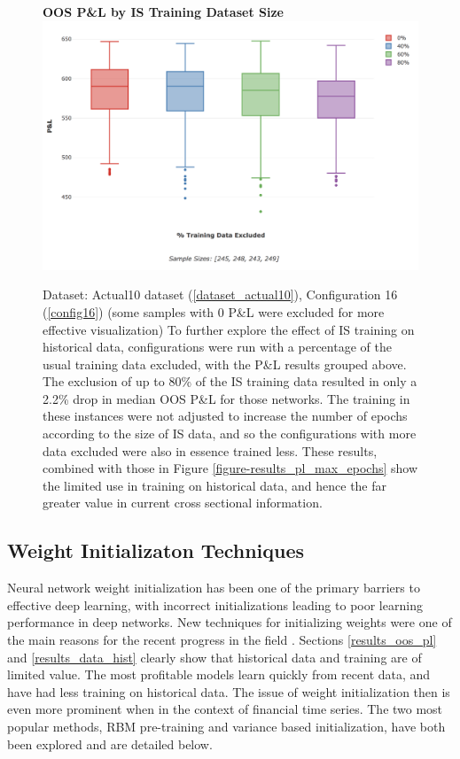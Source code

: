 \documentclass[a4paper,11pt,oneside]{article}
\theoremstyle{plain}
\theoremstyle{definition}
\begin{document}
	
	\begin{figure}[H]
		\centering 
		\textbf{OOS P\&L by IS Training Dataset Size}
		\includegraphics[scale=0.4]{images/results/data/training_data_excluded.png}
		\caption[OOS P\&L by IS Training Dataset Size]{
			Dataset: Actual10 dataset (\ref{dataset_actual10}), Configuration 16 (\ref{config16}) (some samples with 0 P\&L were excluded for more effective visualization)
			\newline To further explore the effect of IS training on historical data, configurations were run with a percentage of the usual training data excluded, with the P\&L results grouped above. The exclusion of up to 80\% of the IS training data resulted in only a 2.2\% drop in median OOS P\&L for those networks. The training in these instances were not adjusted to increase the number of epochs according to the size of IS data, and so the configurations with more data excluded were also in essence trained less. These results, combined with those in Figure \ref{figure-results_pl_max_epochs} show the limited use in training on historical data, and hence the far greater value in current cross sectional information.}
		\label{figure-results_it3_validationset}
	\end{figure}
	
	
	\newpage
	
	\subsection{Weight Initializaton Techniques}\label{results_init}
	
	Neural network weight initialization has been one of the primary barriers to effective deep learning, with incorrect initializations leading to poor learning performance in deep networks. New techniques for initializing weights were one of the main reasons for the recent progress in the field \citep{Hinton2}. Sections \ref{results_oos_pl} and \ref{results_data_hist} clearly show that historical data and training are of limited value. The most profitable models learn quickly from recent data, and have had less training on historical data. The issue of weight initialization then is even more prominent when in the context of financial time series. The two most popular methods, RBM pre-training and variance based initialization, have both been explored and are detailed below.
	
\end{document}
